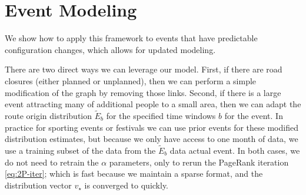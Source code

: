 \documentclass[sigconf, review]{acmart}
\newcommand{\hamid}[1]{{\color{blue}\textbf{HAMID:}\ #1}}
\begin{document}










\section{Event Modeling}
\label{sec:event-modeling}

We show how to apply this framework to events that have predictable configuration changes, which allows for updated modeling.  

There are two direct ways we can leverage our model.   
First, if there are road closures (either planned or unplanned), then we can perform a simple modification of the graph by removing those links.  
Second, if there is a large event attracting many of additional people to a small area, then we can adapt the route origin distribution $\tilde E_b$ for the specified time windows $b$ for the event.  In practice for sporting events or festivals we can use prior events for these modified distribution estimates, but because we only have access to one month of data, we use a training subset of the data from the $\tilde E_b$ data actual event.  
In both cases, we do not need to retrain the $\alpha$ parameters, only to rerun the PageRank iteration \eqref{eq:2P-iter}; which is fast because we maintain a sparse format, and the distribution vector $v_\star$ is converged to quickly.  
\end{document}
